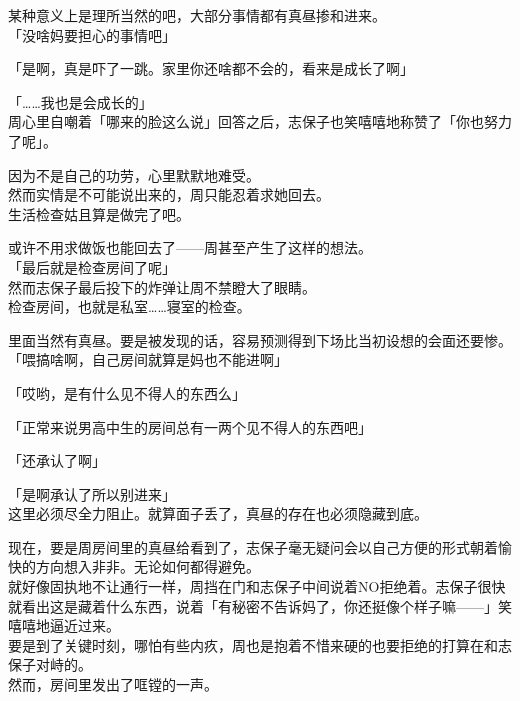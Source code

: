 某种意义上是理所当然的吧，大部分事情都有真昼掺和进来。\\

「没啥妈要担心的事情吧」

「是啊，真是吓了一跳。家里你还啥都不会的，看来是成长了啊」

「……我也是会成长的」\\

周心里自嘲着「哪来的脸这么说」回答之后，志保子也笑嘻嘻地称赞了「你也努力了呢」。

因为不是自己的功劳，心里默默地难受。\\

然而实情是不可能说出来的，周只能忍着求她回去。\\

生活检查姑且算是做完了吧。

或许不用求做饭也能回去了——周甚至产生了这样的想法。\\

「最后就是检查房间了呢」\\

然而志保子最后投下的炸弹让周不禁瞪大了眼睛。\\

检查房间，也就是私室……寝室的检查。

里面当然有真昼。要是被发现的话，容易预测得到下场比当初设想的会面还要惨。\\

「喂搞啥啊，自己房间就算是妈也不能进啊」

「哎哟，是有什么见不得人的东西么」

「正常来说男高中生的房间总有一两个见不得人的东西吧」

「还承认了啊」

「是啊承认了所以别进来」\\

这里必须尽全力阻止。就算面子丢了，真昼的存在也必须隐藏到底。

现在，要是周房间里的真昼给看到了，志保子毫无疑问会以自己方便的形式朝着愉快的方向想入非非。无论如何都得避免。\\

就好像固执地不让通行一样，周挡在门和志保子中间说着NO拒绝着。志保子很快就看出这是藏着什么东西，说着「有秘密不告诉妈了，你还挺像个样子嘛——」笑嘻嘻地逼近过来。\\

要是到了关键时刻，哪怕有些内疚，周也是抱着不惜来硬的也要拒绝的打算在和志保子对峙的。\\

然而，房间里发出了哐镗的一声。\\

